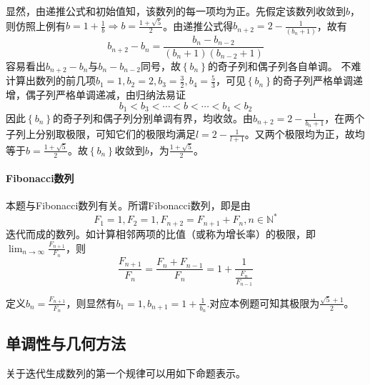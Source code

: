 显然，由递推公式和初始值知，该数列的每一项均为正。先假定该数列收敛到\(b\)，则仿照上例有\(b = 1 + \frac{1}{b} \Rightarrow b = \frac{1 + \sqrt{5}}{2}\)。由递推公式得\(b_{n + 2} = 2 - \frac{1}{\left( b_{n} + 1 \right)}\)，故有
\begin{equation}
    b_{n + 2} - b_{n} = \frac{b_{n} - b_{n - 2}}{\left( b_{n} + 1 \right) \left( b_{n - 2} + 1 \right)}
\end{equation}
容易看出\(b_{n + 2} - b_{n}\)与\(b_{n} - b_{n - 2}\)同号，故\(\left\{ b_{n} \right\}\)的奇子列和偶子列各自单调。
不难计算出数列的前几项\(b_{1} = 1 , b_{2} = 2 , b_{3} = \frac{3}{2} , b_{4} = \frac{5}{3}\)，可见\(\left\{ b_{n} \right\}\)的奇子列严格单调递增，偶子列严格单调递减，由归纳法易证
\begin{equation}
    b_{1} < b_{3} < \cdots < b < \cdots < b_{4} < b_{2}
\end{equation}
因此\(\left\{ b_{n} \right\}\)的奇子列和偶子列分别单调有界，均收敛。由\(b_{n + 2} = 2 - \frac{1}{b_{n} + 1}\)，在两个子列上分别取极限，可知它们的极限均满足\(l = 2 - \frac{1}{l + 1}\)。又两个极限均为正，故均等于\(b = \frac{1 + \sqrt{5}}{2}\)。故\(\left\{ b_{n} \right\}\)收敛到\(b\)，为\(\frac{1 + \sqrt{5}}{2}\)。

\paragraph{Fibonacci数列} \mbox{}

本题与Fibonacci数列有关。所谓Fibonacci数列，即是由
\begin{equation}
    F_{1} = 1 , F_{2} = 1 , F_{n + 2} = F_{n + 1} + F_{n} , n \in \mathbb{N}^{*}
\end{equation}
迭代而成的数列。如计算相邻两项的比值（或称为增长率）的极限，即\(\lim_{n \to \infty} \frac{F_{n + 1}}{F_{n}}\)，则
\begin{equation}
    \frac{F_{n + 1}}{F_{n}} = \frac{F_{n} + F_{n - 1}}{F_{n}} = 1 + \frac{1}{\frac{F_{n}}{F_{n - 1}}}
\end{equation}

定义\(b_{n} = \frac{F_{n + 1}}{F_{n}}\)，则显然有\(b_{1} = 1 , b_{n + 1} = 1 + \frac{1}{b_{n}}\).对应本例题可知其极限为\(\frac{\sqrt{5} + 1}{2}\)。

\enlargethispage{\baselineskip}
\subsection{单调性与几何方法}
关于迭代生成数列的第一个规律可以用如下命题表示。

